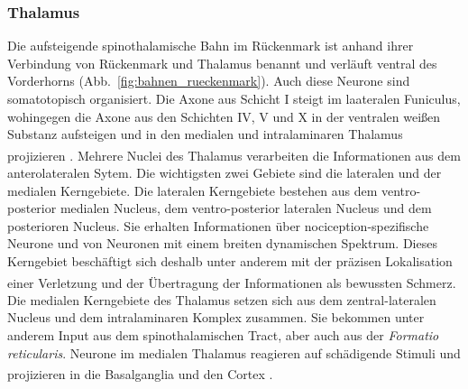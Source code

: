 \documentclass[12pt,a4paper,pdftex]{article}
\begin{document}
\subsubsection*{Thalamus}
Die aufsteigende spinothalamische Bahn im Rückenmark ist anhand ihrer Verbindung von Rückenmark und Thalamus benannt und verläuft ventral des Vorderhorns (Abb.~\ref{fig:bahnen_rueckenmark}). Auch diese Neurone sind somatotopisch organisiert. Die Axone aus Schicht I steigt im laateralen Funiculus, wohingegen die Axone aus den Schichten IV, V und X in der ventralen weißen Substanz aufsteigen und in den medialen und intralaminaren Thalamus projizieren \textsuperscript{\cite[25]{paxinos2014rat}}. 
Mehrere Nuclei des Thalamus verarbeiten die Informationen aus dem anterolateralen Sytem. Die wichtigsten zwei Gebiete sind die lateralen und der medialen Kerngebiete. 
Die lateralen Kerngebiete bestehen aus dem ventro-posterior medialen Nucleus, dem ventro-posterior lateralen Nucleus und dem posterioren Nucleus. Sie erhalten Informationen über nociception-spezifische Neurone und von Neuronen mit einem breiten dynamischen Spektrum. Dieses Kerngebiet beschäftigt sich deshalb unter anderem mit der präzisen Lokalisation einer Verletzung und der Übertragung der Informationen als bewussten Schmerz\textsuperscript{\cite[24]{kandel2013principles}}.
\\
\noindent Die medialen Kerngebiete des Thalamus setzen sich aus dem zentral-lateralen Nucleus und dem intralaminaren Komplex zusammen. Sie bekommen unter anderem Input aus dem spinothalamischen Tract, aber auch aus der \textit{Formatio reticularis}. Neurone im medialen Thalamus reagieren auf schädigende Stimuli und projizieren in die Basalganglia und den Cortex \textsuperscript{\cite[24]{kandel2013principles}}.
\end{document}
